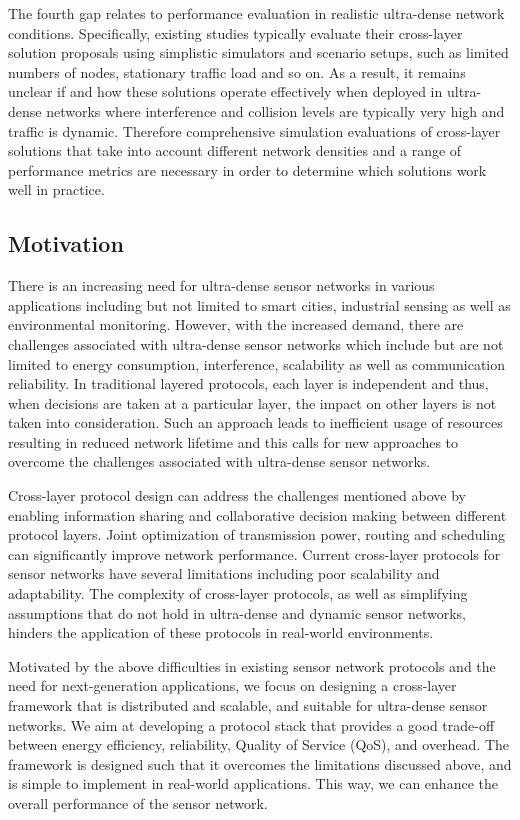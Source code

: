 \documentclass[a4paper,fleqn]{cas-dc}
\numberwithin{equation}{section}
\begin{document}
The fourth gap relates to performance evaluation in realistic ultra-dense network conditions. Specifically, existing studies typically evaluate their cross-layer solution proposals using simplistic simulators and scenario setups, such as limited numbers of nodes, stationary traffic load and so on. As a result, it remains unclear if and how these solutions operate effectively when deployed in ultra-dense networks where interference and collision levels are typically very high and traffic is dynamic. Therefore comprehensive simulation evaluations of cross-layer solutions that take into account different network densities and a range of performance metrics are necessary in order to determine which solutions work well in practice.

\subsection{Motivation}

There is an increasing need for ultra-dense sensor networks in various applications including but not limited to smart cities, industrial sensing as well as environmental monitoring. However, with the increased demand, there are challenges associated with ultra-dense sensor networks which include but are not limited to energy consumption, interference, scalability as well as communication reliability. In traditional layered protocols, each layer is independent and thus, when decisions are taken at a particular layer, the impact on other layers is not taken into consideration. Such an approach leads to inefficient usage of resources resulting in reduced network lifetime and this calls for new approaches to overcome the challenges associated with ultra-dense sensor networks.

Cross-layer protocol design can address the challenges mentioned above by enabling information sharing and collaborative decision making between different protocol layers. Joint optimization of transmission power, routing and scheduling can significantly improve network performance. Current cross-layer protocols for sensor networks have several limitations including poor scalability and adaptability. The complexity of cross-layer protocols, as well as simplifying assumptions that do not hold in ultra-dense and dynamic sensor networks, hinders the application of these protocols in real-world environments.

Motivated by the above difficulties in existing sensor network protocols and the need for next-generation applications, we focus on designing a cross-layer framework that is distributed and scalable, and suitable for ultra-dense sensor networks. We aim at developing a protocol stack that provides a good trade-off between energy efficiency, reliability, Quality of Service (QoS), and overhead. The framework is designed such that it overcomes the limitations discussed above, and is simple to implement in real-world applications. This way, we can enhance the overall performance of the sensor network.
\end{document}
